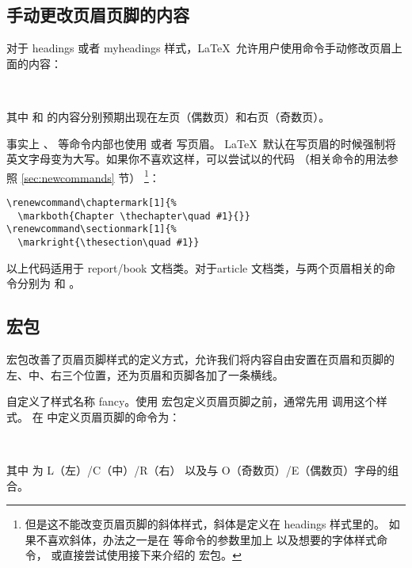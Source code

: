 \subsection{手动更改页眉页脚的内容}

对于 headings 或者 myheadings 样式，\LaTeX\ 允许用户使用命令手动修改页眉上面的内容：
\begin{command}
\\
\end{command}

其中  和  的内容分别预期出现在左页（偶数页）和右页（奇数页）。

事实上 、 等命令内部也使用  或者  写页眉。
\LaTeX\ 默认在写页眉的时候强制将英文字母变为大写。如果你不喜欢这样，可以尝试以的代码
（相关命令的用法参照 \ref{sec:newcommands} 节）%
\footnote{但是这不能改变页眉页脚的斜体样式，斜体是定义在 headings 样式里的。
如果不喜欢斜体，办法之一是在  等命令的参数里加上  以及想要的字体样式命令，
或直接尝试使用接下来介绍的  宏包。}：
\begin{verbatim}
\renewcommand\chaptermark[1]{%
  \markboth{Chapter \thechapter\quad #1}{}}
\renewcommand\sectionmark[1]{%
  \markright{\thesection\quad #1}}
\end{verbatim}

以上代码适用于 report/book 文档类。对于article 文档类，与两个页眉相关的命令分别为  和  。

\subsection{ 宏包}

 宏包改善了页眉页脚样式的定义方式，允许我们将内容自由安置在页眉和页脚的左、中、右三个位置，还为页眉和页脚各加了一条横线。

 自定义了样式名称 fancy。使用  宏包定义页眉页脚之前，通常先用  调用这个样式。
在  中定义页眉页脚的命令为：
\begin{command}
\\
\end{command}
其中  为 L（左）/C（中）/R（右） 以及与 O（奇数页）/E（偶数页）字母的组合。

